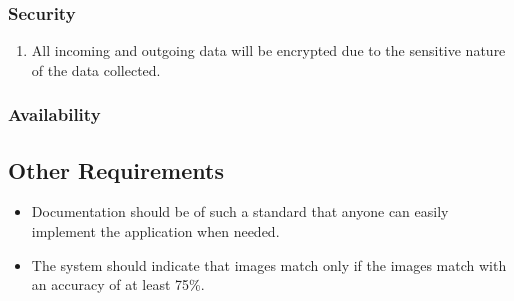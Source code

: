 \documentclass{article}
\begin{document}
		\subsubsection{Security}
		\begin{enumerate}
		    \item All incoming and outgoing data will be encrypted due to the sensitive nature of the data collected.
		\end{enumerate}
		\subsubsection{Availability}

		\subsection{Other Requirements}\label{subsec:specific-other}
		\begin{itemize}
            \item Documentation should be of such a standard that anyone can easily implement the application when needed.
            \item The system should indicate that images match only if the images match with an accuracy of at least 75\%.
		\end{itemize}

	\cleardoublepage
\end{document}
